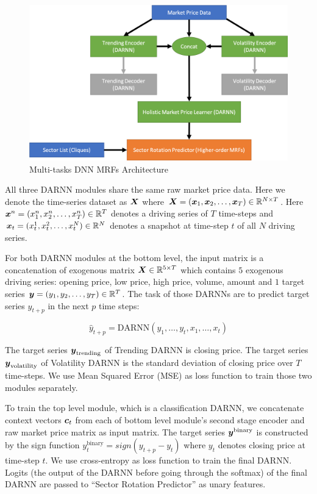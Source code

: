 \documentclass[sigconf, anonymous, review]{acmart}
\begin{document}
\begin{figure}[ht]
  \centering
  \includegraphics[width=1\columnwidth]{Methodology/figures/mrfrnn}
  \caption{\label{fig:mrfrnn} Multi-tasks DNN MRFs Architecture}
\end{figure}

All three DARNN modules share the same raw market price data.
Here we denote the time-series dataset as ${\boldsymbol{X}}$ where
${\boldsymbol{X}}=({\boldsymbol{x}}_1,{\boldsymbol{x}}_2,\dots,{\boldsymbol{x}}_T)\in \mathbb{R}^{N\times T}$. Here
${\boldsymbol{x}}^n=(x_1^n,x_2^n,\dots,x_T^n) \in \mathbb{R}^T$ denotes a driving
series of $T$ time-steps and ${\boldsymbol{x}}_t=(x_t^1,x_t^2\\ ,\dots
,x_t^N)\in \mathbb{R}^N$ denotes a snapshot at time-step $t$ of all
$N$ driving series.

For both DARNN modules at the bottom level, the input matrix is a
concatenation of exogenous matrix ${\boldsymbol{X}} \in \mathbb{R}^{5\times T}$
which contains $5$ exogenous driving series: opening price, low
price, high price, volume, amount and $1$ target series ${\boldsymbol{y}} =
(y_1,y_2,\dots,y_T) \in \mathbb{R}^T$. The task of those DARNNs are
to predict target series $y_{t+p}$ in the next $p$ time steps:

$$\hat{y}_{t+p} = \text{DARNN}(y_1,\dots,y_{t},x_1,\dots,x_t)$$

The target series ${\boldsymbol{y}}_{\text{trending}}$ of Trending DARNN is
closing price. The target series ${\boldsymbol{y}}_{\text{volatility}}$ of
Volatility DARNN is the standard deviation of closing price over
$T$ time-steps. We use Mean Squared Error (MSE) as loss function
to train those two modules separately.

To train the top level module, which is a classification DARNN,
we concatenate context vectors $\boldsymbol{c}_t$ from each of bottom level
module's second stage encoder and raw market price matrix as
input matrix. The target series ${\boldsymbol{y}}^{\text{binary}}$ is
constructed by the sign function $y_t^{\text{binary}} =
sign(y_{t+p}-y_t)$ where $y_t$ denotes closing price at time-step
$t$. We use cross-entropy as loss function to train the final
DARNN. Logits (the output of the DARNN before going through the
softmax) of the final DARNN are passed to ``Sector Rotation
Predictor'' as unary features.
\end{document}
